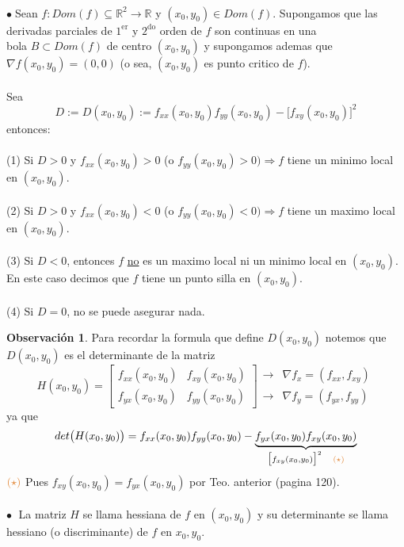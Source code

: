 \documentclass{article}
\theoremstyle{definition}
\theoremstyle{definition}
\newtheorem*{obs}{Observación}
\theoremstyle{remark}
\newcommand\bl{$\bullet\;$}
\begin{document}
\begin{teo}
   \;\\
  \bl Sean $ f : Dom(f) \subseteq \mathbb{R}^2 \to \mathbb{R}$ y $(x_0,y_0) \in Dom(f)$. Supongamos que las derivadas parciales de $1^{\text{er}}$ y $2^{\text{do}}$ orden de $f$ son continuas en una \\ bola $B \subset Dom(f)$ de centro $(x_0,y_0)$ y supongamos ademas que \\ $\nabla f (x_0,y_0)=(0,0)$ \quad \big(o sea, $(x_0,y_0)$ es punto critico de $f$\big).\\\\
  Sea $$  D := D(x_0,y_0) :=f_{xx}(x_0,y_0)f_{yy}(x_0,y_0)-
\big[f_{xy}(x_0,y_0)\big]^2
$$ entonces:\\\\
\textcolor{rojop2}{(1)}  Si $D>0$ y $f_{xx}(x_0,y_0) > 0$ \; \big(o $f_{yy}(x_0,y_0)>0\big) \Rightarrow  f$ tiene un minimo local en $(x_0,y_0)$. \\\\
\textcolor{rojop2}{(2)} Si $D>0$ y $f_{xx}(x_0,y_0) < 0$ \; \big(o $f_{yy}(x_0,y_0)<0\big) \Rightarrow  f$ tiene un maximo local en $(x_0,y_0)$. \\\\
\textcolor{rojop2}{(3)} Si $D<0$, entonces $f$ \underline{no} es un maximo local ni un minimo local en $(x_0,y_0)$. En este caso decimos que $f$ tiene un punto silla en $(x_0,y_0)$. \\\\
\textcolor{rojop2}{(4)} Si $D=0$, no se puede asegurar nada.
\end{teo}
\pagebreak
\begin{obs}
Para recordar la formula que define $D(x_0,y_0)$ notemos que $D(x_0,y_0)$ es el determinante de la matriz \[
  H(x_0,y_0)=\left[\begin{array}{ll}
  f_{xx}(x_0,y_0) & f_{xy}(x_0,y_0) \\
  f_{yx}(x_0,y_0) & f_{yy}(x_0,y_0)
\end{array}\right] \begin{array}{ll}
  \rightarrow & \nabla f_x=(f_{xx},f_{xy}) \\
\rightarrow & \nabla f_{y} = (f_{yx},f_{yy})
\end{array}
\]
ya que $$det\big(H(x_0,y_0)\big) =f_{xx}(x_0,y_0)f_{yy}(x_0,y_0)-\underbrace{f_{yx}(x_0,y_0)f_{xy}(x_0,y_0)}_{\big[f_{xy}(x_0,y_0)\big]^2 \quad\textcolor{rojop2}{(\star)}}$$ 
$\textcolor{rojop2}{(\star)}$ Pues $f_{xy}(x_0,y_0)=f_{yx}(x_0,y_0)$ por Teo. anterior (pagina 120). \\\\
\textcolor{rojop2}{\bl} La matriz $H$ se llama hessiana de $f$ en $(x_0,y_0)$ y su determinante se llama hessiano (o discriminante) de $f$ en $x_0,y_0$.
\end{obs}
\end{document}
